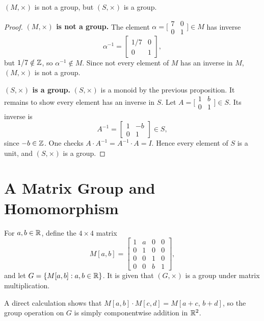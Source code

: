 \begin{proposition}
$(M, \times)$ is not a group, but $(S, \times)$ is a group.
\end{proposition}
\begin{proof}
\textbf{$(M, \times)$ is not a group.}
The element $\alpha = \bigl[\begin{smallmatrix}7&0\\0&1\end{smallmatrix}\bigr] \in M$
has inverse
\[
    \alpha^{-1} = \begin{bmatrix} 1/7 & 0 \\ 0 & 1 \end{bmatrix},
\]
but $1/7 \notin \mathbb{Z}$, so $\alpha^{-1} \notin M$. Since not every element of $M$
has an inverse in $M$, $(M, \times)$ is not a group.

\textbf{$(S, \times)$ is a group.}
$(S, \times)$ is a monoid by the previous proposition. It remains to show
every element has an inverse in $S$. Let $A = \bigl[\begin{smallmatrix}1&b\\0&1\end{smallmatrix}\bigr] \in S$.
Its inverse is
\[
    A^{-1} = \begin{bmatrix} 1 & -b \\ 0 & 1 \end{bmatrix} \in S,
\]
since $-b \in \mathbb{Z}$. One checks $A \cdot A^{-1} = A^{-1} \cdot A = I$.
Hence every element of $S$ is a unit, and $(S, \times)$ is a group.
\end{proof}

\section{A Matrix Group and Homomorphism}

For $a, b \in \mathbb{R}$, define the $4 \times 4$ matrix
\[
    M[a, b]
    =
    \begin{bmatrix}
        1 & a & 0 & 0 \\
        0 & 1 & 0 & 0 \\
        0 & 0 & 1 & 0 \\
        0 & 0 & b & 1
    \end{bmatrix},
\]
and let $G = \{M[a,b] : a, b \in \mathbb{R}\}$. It is given that $(G, \times)$ is a
group under matrix multiplication.

\begin{note}
A direct calculation shows that $M[a,b] \cdot M[c,d] = M[a+c,\, b+d]$, so
the group operation on $G$ is simply componentwise addition in $\mathbb{R}^2$.
\end{note}

